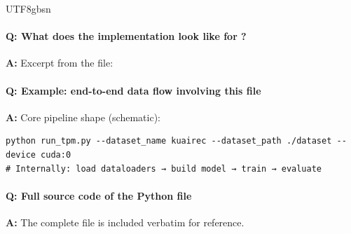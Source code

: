\documentclass[11pt]{article}
\begin{document}
\begin{CJK*}{UTF8}{gbsn}
\paragraph{Q: What does the implementation look like for \texttt{}?}
\textbf{A:} Excerpt from the file:

\vspace{1mm}


\paragraph{Q: Example: end-to-end data flow involving this file}
\textbf{A:} Core pipeline shape (schematic):

\begin{Verbatim}[fontsize=\small]
python run_tpm.py --dataset_name kuairec --dataset_path ./dataset --device cuda:0
# Internally: load dataloaders → build model → train → evaluate
\end{Verbatim}

\paragraph{Q: Full source code of the Python file}
\textbf{A:} The complete file is included verbatim for reference.


\end{CJK*}
\end{document}
